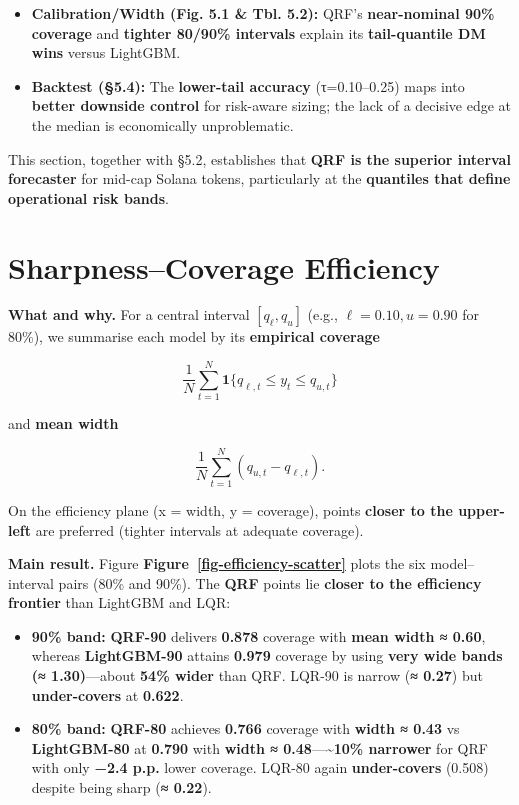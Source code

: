 \documentclass[
  a4paper,
  DIV=11,
  numbers=noendperiod]{scrreprt}
\providecommand{\tightlist}{%
  \setlength{\itemsep}{0pt}\setlength{\parskip}{0pt}}
\begin{document}
\begin{itemize}
\tightlist
\item
  \textbf{Calibration/Width (Fig. 5.1 \& Tbl. 5.2):} QRF's
  \textbf{near-nominal 90\% coverage} and \textbf{tighter 80/90\%
  intervals} explain its \textbf{tail-quantile DM wins} versus LightGBM.
\item
  \textbf{Backtest (§5.4):} The \textbf{lower-tail accuracy}
  (τ=0.10--0.25) maps into \textbf{better downside control} for
  risk-aware sizing; the lack of a decisive edge at the median is
  economically unproblematic.
\end{itemize}

This section, together with §5.2, establishes that \textbf{QRF is the
superior interval forecaster} for mid-cap Solana tokens, particularly at
the \textbf{quantiles that define operational risk bands}.

\section{Sharpness--Coverage
Efficiency}\label{sharpnesscoverage-efficiency}

\textbf{What and why.} For a central interval \([q_\ell, q_u]\) (e.g.,
\(\ell=0.10, u=0.90\) for 80\%), we summarise each model by its
\textbf{empirical coverage}

\[
\frac{1}{N}\sum_{t=1}^N \mathbf{1}\{q_{\ell,t}\le y_t \le q_{u,t}\}
\]

and \textbf{mean width}

\[
\frac{1}{N}\sum_{t=1}^N (q_{u,t}-q_{\ell,t}).
\]

On the efficiency plane (x = width, y = coverage), points \textbf{closer
to the upper-left} are preferred (tighter intervals at adequate
coverage).

\textbf{Main result.} Figure
\textbf{Figure~\ref{fig-efficiency-scatter}} plots the six
model--interval pairs (80\% and 90\%). The \textbf{QRF} points lie
\textbf{closer to the efficiency frontier} than LightGBM and LQR:

\begin{itemize}
\tightlist
\item
  \textbf{90\% band:} \textbf{QRF-90} delivers \textbf{0.878} coverage
  with \textbf{mean width ≈ 0.60}, whereas \textbf{LightGBM-90} attains
  \textbf{0.979} coverage by using \textbf{very wide bands (≈
  1.30)}---about \textbf{54\% wider} than QRF. LQR-90 is narrow
  (\textbf{≈ 0.27}) but \textbf{under-covers} at \textbf{0.622}.
\item
  \textbf{80\% band:} \textbf{QRF-80} achieves \textbf{0.766} coverage
  with \textbf{width ≈ 0.43} vs \textbf{LightGBM-80} at \textbf{0.790}
  with \textbf{width ≈ 0.48}---\textbf{\textasciitilde10\% narrower} for
  QRF with only \textbf{−2.4 p.p.} lower coverage. LQR-80 again
  \textbf{under-covers} (0.508) despite being sharp (\textbf{≈ 0.22}).
\end{itemize}
\end{document}
